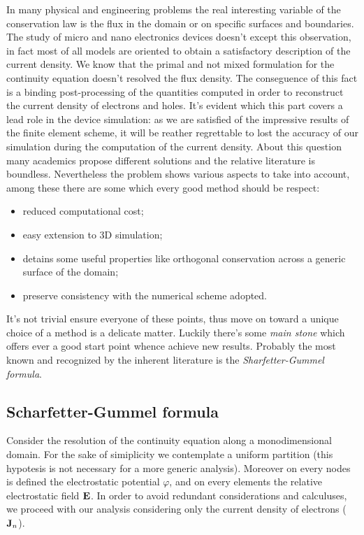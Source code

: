 In many physical and engineering problems the real interesting variable of the conservation law is the flux in the domain or on specific surfaces and boundaries. The study of micro and nano electronics devices doesn't except this observation, in fact most of all models are oriented to obtain a satisfactory description of the current density.
 We know that the primal and not mixed formulation for  the continuity equation doesn't resolved  the flux density. The conseguence of this fact is a binding post-processing of the quantities computed in order to reconstruct the current density of electrons and holes.
It's evident which this part covers a lead role in the device simulation: 
as we are satisfied of the impressive results of the finite element scheme, it will be reather regrettable to lost the accuracy of our simulation during the computation of the current density.
About this question many academics propose different solutions and  the relative literature is boundless.
 Nevertheless the problem shows various aspects to take into account, among these there are some which every good method should be respect:	
 \begin{itemize}
 \item reduced computational cost;
 \item easy extension to 3D simulation;
 \item detains some useful properties like orthogonal conservation across a generic surface of the domain;
 \item preserve consistency with the numerical scheme adopted.
 \end{itemize}
 It's not trivial ensure everyone of these points, thus move on toward a unique choice of a method is a delicate matter. Luckily there's some \textit{main stone} which offers ever a good start point whence achieve new results. Probably the most known and recognized by the inherent literature is the \textit{Sharfetter-Gummel formula}.

\subsection{Scharfetter-Gummel formula}

Consider the resolution of the continuity equation along a monodimensional domain. For the sake of simiplicity we contemplate a uniform partition (this hypotesis is not necessary for a more generic analysis). Moreover on every nodes is defined the electrostatic potential $\varphi$, and on every elements the relative electrostatic field $\mathbf{E}$. In order to avoid redundant considerations and calculuses, we proceed with our analysis considering only the current density of electrons ($\mathbf{J}_n$).

